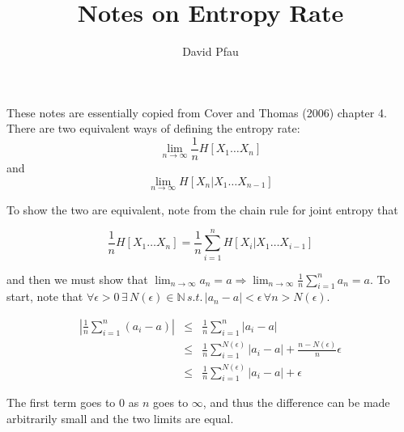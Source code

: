 \documentclass[11pt]{article}
\title{Notes on Entropy Rate}
\author{David Pfau}
\begin{document}
\maketitle

These notes are essentially copied from Cover and Thomas (2006) chapter 4.  There are two equivalent ways of defining the entropy rate:
\[ \lim_{n\to\infty} \frac{1}{n} H[X_1\ldots X_n] \]
and
\[ \lim_{n\to\infty} H[X_n|X_1\ldots X_{n-1}] \]

To show the two are equivalent, note from the chain rule for joint entropy that

\[ \frac{1}{n}H[X_1 \ldots X_n] = \frac{1}{n}\sum_{i=1}^{n} H[X_i | X_1 \ldots X_{i-1}] \]

and then we must show that $\lim_{n\to\infty} a_n = a \Rightarrow \lim_{n\to\infty} \frac{1}{n}\sum_{i=1}^n a_n = a$.  To start, note that $\forall \epsilon > 0 \,\exists\, N(\epsilon) \in \mathbb{N}\,s.t.\,|a_n - a| < \epsilon\,\forall n > N(\epsilon)$.

\begin{eqnarray*}
\left|\frac{1}{n}\sum_{i=1}^n (a_i - a)\right| & \le & \frac{1}{n}\sum_{i=1}^n |a_i - a| \\
& \le & \frac{1}{n}\sum_{i=1}^{N(\epsilon)} |a_i - a| + \frac{n-N(\epsilon)}{n}\epsilon \\
& \le & \frac{1}{n}\sum_{i=1}^{N(\epsilon)}|a_i-a| + \epsilon
\end{eqnarray*}

The first term goes to 0 as $n$ goes to $\infty$, and thus the difference can be made arbitrarily small and the two limits are equal.
\end{document}
